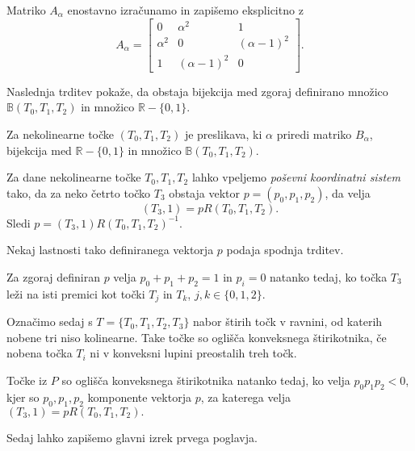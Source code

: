 \documentclass[mat1]{fmfdelo}
\newcommand{\R}{\mathbb R}
\newcommand{\B}{\mathbb B}
\newcommand{\al}{\alpha}
\begin{document}
\begin{opomba}
Matriko $A_\al$ enostavno izračunamo in zapišemo eksplicitno z %
$$A_\al = 
\begin{bmatrix}
0 & \al^2 & 1 \\
\al^2 & 0 & (\al - 1)^2 \\
1 & (\al -1)^2 & 0
\end{bmatrix}
.$$

\end{opomba}

Naslednja trditev pokaže, da obstaja bijekcija med zgoraj definirano množico $\B(T_0, T_1, T_2)$ in množico $\R - \{0, 1\}$.

\begin{trditev}
Za nekolinearne točke $(T_0, T_1, T_2)$ je preslikava, ki $\al$ priredi matriko $B_{\al}$, bijekcija med $\R - \{0, 1\}$ in množico $\B(T_0, T_1, T_2)$.
\end{trditev}

Za dane nekolinearne točke $T_0, T_1, T_2$ lahko vpeljemo \emph{poševni koordinatni sistem} tako, da za neko četrto točko $T_3$ obstaja vektor $p = (p_0, p_1, p_2)$, da velja
$$(T_3, 1) = p R(T_0, T_1, T_2).$$ Sledi $ p = (T_3, 1) R(T_0, T_1, T_2)^{-1}$.

Nekaj lastnosti tako definiranega vektorja $p$ podaja spodnja trditev.

\begin{trditev}
Za zgoraj definiran $p$ velja $p_0 + p_1 + p_2 = 1$ in $p_i = 0$ natanko tedaj, ko točka $T_3$ leži na isti premici kot točki $T_j$ in $T_k$, $j, k \in \{0, 1, 2 \}$. 
\end{trditev}

Označimo sedaj s $T = \{T_0, T_1, T_2, T_3 \}$ nabor štirih točk v ravnini, od katerih nobene tri niso kolinearne. Take točke so oglišča konveksnega štirikotnika, če nobena točka $T_i$ ni v konveksni lupini preostalih treh točk.

\begin{trditev}
Točke iz $P$ so oglišča konveksnega štirikotnika natanko tedaj, ko velja $p_0 p_1 p_2 < 0$, kjer so $p_0, p_1, p_2$ komponente vektorja $p$, za katerega velja $(T_3, 1) = p R(T_0, T_1, T_2).$
\end{trditev}

Sedaj lahko zapišemo glavni izrek prvega poglavja.
\end{document}
